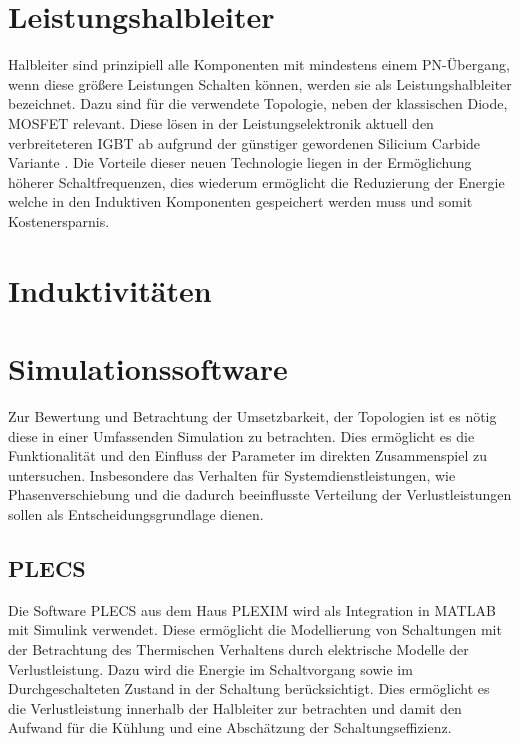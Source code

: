 \section{Leistungshalbleiter}
Halbleiter sind prinzipiell alle Komponenten mit mindestens einem PN-Übergang, wenn diese größere Leistungen Schalten können, werden sie als Leistungshalbleiter bezeichnet. Dazu sind für die verwendete Topologie, neben der klassischen Diode, MOSFET relevant. Diese lösen in der Leistungselektronik aktuell den verbreiteteren IGBT ab aufgrund der günstiger gewordenen Silicium Carbide Variante \cite{SiCTrend}. Die Vorteile dieser neuen Technologie liegen in der Ermöglichung höherer Schaltfrequenzen, dies wiederum ermöglicht die Reduzierung der Energie welche in den Induktiven Komponenten gespeichert werden muss und somit Kostenersparnis. 

\section{Induktivitäten}

\section{Simulationssoftware}
Zur Bewertung und Betrachtung der Umsetzbarkeit, der Topologien ist es nötig diese in einer Umfassenden Simulation zu betrachten. Dies ermöglicht es die Funktionalität und den Einfluss der Parameter im direkten Zusammenspiel zu untersuchen. Insbesondere das Verhalten für Systemdienstleistungen, wie Phasenverschiebung und die dadurch beeinflusste Verteilung der Verlustleistungen sollen als Entscheidungsgrundlage dienen. 

	\subsection{PLECS}
	Die Software \gls{PLECS} aus dem Haus PLEXIM wird als Integration in MATLAB mit Simulink verwendet.  Diese ermöglicht die Modellierung von Schaltungen mit der Betrachtung des Thermischen Verhaltens durch elektrische Modelle der Verlustleistung. Dazu wird die Energie im Schaltvorgang sowie im Durchgeschalteten Zustand in der Schaltung berücksichtigt. Dies ermöglicht es die Verlustleistung innerhalb der Halbleiter zur betrachten und damit den Aufwand für die Kühlung und eine Abschätzung der Schaltungseffizienz. 